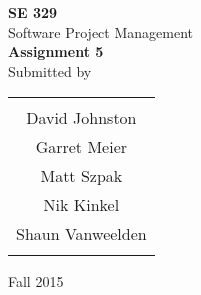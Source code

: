 \begin{titlepage}

\begin{center}

\textup{\small {\bf SE 329} \\ Software Project Management}\\[0.2in]

\Huge \textbf {Assignment 5}\\[0.5in]

\normalsize Submitted by \\
\begin{table}[h]
\centering
\begin{tabular}{c}
\hline \\
David Johnston \\
Garret Meier \\
Matt Szpak \\
Nik Kinkel \\
Shaun Vanweelden \\
\\ \hline
\end{tabular}
\end{table}

\vfill

\vspace{0.2cm}
Fall 2015

\end{center}
\end{titlepage}
